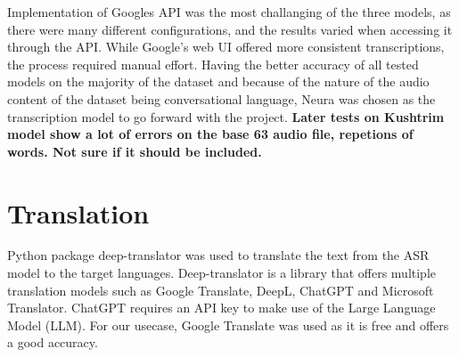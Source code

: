 \documentclass[12pt]{article}
\begin{document}
Implementation of Googles API was the most challanging of the three models, as there were many different configurations, and the results varied when accessing it through the API. While Google's web UI offered more consistent transcriptions, the process required manual effort. Having the better accuracy of all tested models on the majority of the dataset and because of the nature of the audio content of the dataset being conversational language, Neura was chosen as the transcription model to go forward with the project. \textbf{Later tests on Kushtrim model show a lot of errors on the base 63 audio file, repetions of words. Not sure if it should be included.}

\section{Translation}
Python package deep-translator was used to translate the text from the ASR model to the target languages. Deep-translator is a library that offers multiple translation models such as Google Translate, DeepL, ChatGPT and Microsoft Translator. ChatGPT requires an API key to make use of the Large Language Model (LLM). For our usecase, Google Translate was used as it is free and offers a good accuracy.
\end{document}
